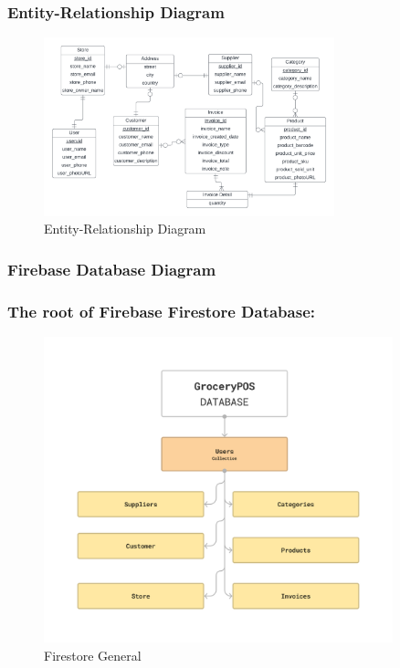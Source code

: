 \documentclass[../thesis.tex]{subfiles}
\begin{document}
\subsubsection{Entity-Relationship Diagram}
\begin{figure}[H]
    \centering
    \includegraphics[width=0.75\textwidth]{images/ER_Diagram.png}
    \caption{Entity-Relationship Diagram}
    \label{fig:ER_Diagram}
\end{figure}
\subsubsection{Firebase Database Diagram}
\subsubsection*{The root of Firebase Firestore Database: }

\begin{figure}[H]
    \centering
    \includegraphics[width=0.9\textwidth]{images/Firebase_General.png}
    \caption{Firestore General}
    \label{fig:Firestore_General}
\end{figure}
\end{document}
